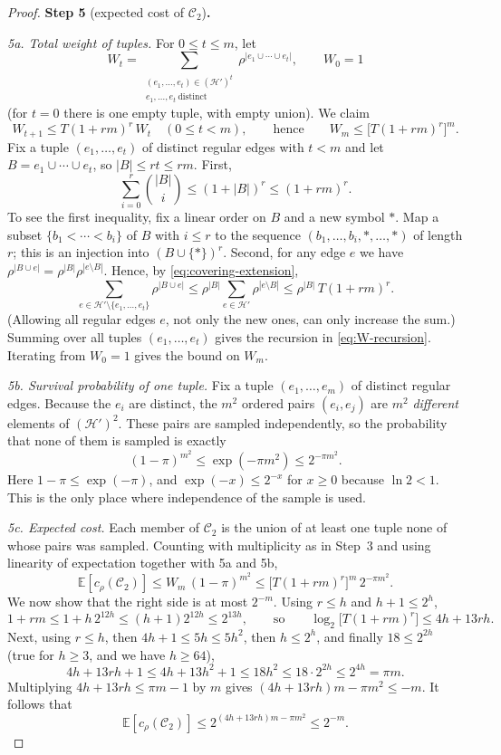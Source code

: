 \documentclass[11pt,letterpaper]{article}
\theoremstyle{definition}
\theoremstyle{remark}
\numberwithin{equation}{section}
\newcommand{\step}[2]{\medskip\noindent\textbf{Step #1} (#2)\textbf{.}\ }
\begin{document}
\begin{proof}
\step{5}{expected cost of $\mathcal C_2$}

\emph{5a. Total weight of tuples.} For \(0\le t\le m\), let
\[
W_t=
\sum_{\substack{(e_1,\ldots,e_t)\in(\mathcal H')^t\\
                e_1,\ldots,e_t\ \text{distinct}}}
  \rho^{|e_1\cup\cdots\cup e_t|},
\qquad W_0=1
\]
(for $t=0$ there is one empty tuple, with empty union). We claim
\begin{equation}\label{eq:W-recursion}
W_{t+1}\le T(1+rm)^r\,W_t\quad(0\le t<m),
\qquad\text{hence}\qquad
W_m\le\bigl[T(1+rm)^r\bigr]^m .
\end{equation}
Fix a tuple $(e_1,\ldots,e_t)$ of distinct regular edges with $t<m$ and let
$B=e_1\cup\cdots\cup e_t$, so $|B|\le rt\le rm$. First,
\[
\sum_{i=0}^r\binom{|B|}{i}\le(1+|B|)^r\le(1+rm)^r .
\]
To see the first inequality, fix a linear order on $B$ and a new symbol
$\ast$. Map a subset $\{b_1<\cdots<b_i\}$ of $B$ with $i\le r$ to the
sequence $(b_1,\ldots,b_i,\ast,\ldots,\ast)$ of length $r$; this is an
injection into $(B\cup\{\ast\})^r$. Second, for any edge $e$ we have
\(\rho^{|B\cup e|}=\rho^{|B|}\rho^{|e\setminus B|}\). Hence, by
\eqref{eq:covering-extension},
\[
\sum_{e\in\mathcal H'\setminus\{e_1,\ldots,e_t\}}\rho^{|B\cup e|}
\le\rho^{|B|}\sum_{e\in\mathcal H'}\rho^{|e\setminus B|}
\le\rho^{|B|}\,T(1+rm)^r .
\]
(Allowing all regular edges $e$, not only the new ones, can only increase
the sum.) Summing over all tuples $(e_1,\ldots,e_t)$ gives the recursion in
\eqref{eq:W-recursion}. Iterating from $W_0=1$ gives the bound on $W_m$.

\emph{5b. Survival probability of one tuple.} Fix a tuple
$(e_1,\ldots,e_m)$ of distinct regular edges. Because the $e_i$ are
distinct, the $m^2$ ordered pairs $(e_i,e_j)$ are $m^2$ \emph{different}
elements of $(\mathcal H')^2$. These pairs are sampled independently, so
the probability that none of them is sampled is exactly
\[
(1-\pi)^{m^2}\le \exp(-\pi m^2)\le2^{-\pi m^2}.
\]
Here $1-\pi\le\exp(-\pi)$, and $\exp(-x)\le2^{-x}$ for $x\ge0$ because
$\ln2<1$. This is the only place where independence of the sample is used.

\emph{5c. Expected cost.} Each member of $\mathcal C_2$ is the union of at
least one tuple none of whose pairs was sampled. Counting with
multiplicity as in Step~3 and using linearity of expectation together
with 5a and 5b,
\[
\mathbb E[c_\rho(\mathcal C_2)]
\le W_m\,(1-\pi)^{m^2}
\le\bigl[T(1+rm)^r\bigr]^m\,2^{-\pi m^2}.
\]
We now show that the right side is at most $2^{-m}$. Using $r\le h$ and
$h+1\le2^h$,
\[
1+rm\le1+h\,2^{12h}\le(h+1)2^{12h}\le2^{13h},
\qquad\text{so}\qquad
\log_2\bigl[T(1+rm)^r\bigr]\le4h+13rh .
\]
Next, using $r\le h$, then $4h+1\le5h\le5h^2$, then $h\le2^h$, and finally
$18\le2^{2h}$ (true for $h\ge3$, and we have $h\ge64$),
\[
4h+13rh+1\le4h+13h^2+1\le18h^2\le18\cdot2^{2h}\le2^{4h}=\pi m .
\]
Multiplying $4h+13rh\le\pi m-1$ by $m$ gives
$(4h+13rh)m-\pi m^2\le-m$. It follows that
\begin{equation}\label{eq:covering-residual-cost}
\mathbb E[c_\rho(\mathcal C_2)]
\le2^{(4h+13rh)m-\pi m^2}\le2^{-m}.
\end{equation}


\end{proof}
\end{document}
